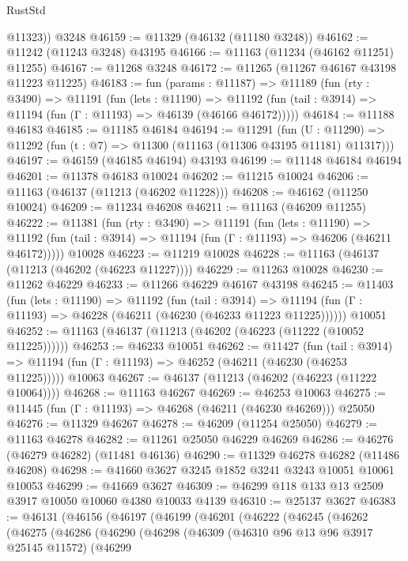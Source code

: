 \begin{lexlean}{RustStd}
\begin{coremodule}
        @11323))
    @3248
@46159 := @11329 (@46132 (@11180 @3248))
@46162 := @11242 (@11243 @3248) @43195
@46166 := @11163 (@11234 (@46162 @11251) @11255)
@46167 := @11268 @3248
@46172 := @11265 (@11267 @46167 @43198 @11223 @11225)
@46183 := fun (params : @11187) =>
  @11189
    (fun (rty : @3490) =>
    @11191
      (fun (lets : @11190) =>
      @11192 (fun (tail : @3914) => @11194 (fun (Γ : @11193) => @46139 (@46166 @46172)))))
@46184 := @11188 @46183
@46185 := @11185 @46184
@46194 := @11291
    (fun (U : @11290) => @11292 (fun (t : @7) => @11300 (@11163 (@11306 @43195 @11181) @11317)))
@46197 := @46159 (@46185 @46194) @43193
@46199 := @11148 @46184 @46194
@46201 := @11378 @46183 @10024
@46202 := @11215 @10024
@46206 := @11163 (@46137 (@11213 (@46202 @11228)))
@46208 := @46162 (@11250 @10024)
@46209 := @11234 @46208
@46211 := @11163 (@46209 @11255)
@46222 := @11381
    (fun (rty : @3490) =>
    @11191
      (fun (lets : @11190) =>
      @11192 (fun (tail : @3914) => @11194 (fun (Γ : @11193) => @46206 (@46211 @46172)))))
    @10028
@46223 := @11219 @10028
@46228 := @11163 (@46137 (@11213 (@46202 (@46223 @11227))))
@46229 := @11263 @10028
@46230 := @11262 @46229
@46233 := @11266 @46229 @46167 @43198
@46245 := @11403
    (fun (lets : @11190) =>
    @11192
      (fun (tail : @3914) =>
      @11194 (fun (Γ : @11193) => @46228 (@46211 (@46230 (@46233 @11223 @11225))))))
    @10051
@46252 := @11163 (@46137 (@11213 (@46202 (@46223 (@11222 (@10052 @11225))))))
@46253 := @46233 @10051
@46262 := @11427
    (fun (tail : @3914) => @11194 (fun (Γ : @11193) => @46252 (@46211 (@46230 (@46253 @11225)))))
    @10063
@46267 := @46137 (@11213 (@46202 (@46223 (@11222 @10064))))
@46268 := @11163 @46267
@46269 := @46253 @10063
@46275 := @11445 (fun (Γ : @11193) => @46268 (@46211 (@46230 @46269))) @25050
@46276 := @11329 @46267
@46278 := @46209 (@11254 @25050)
@46279 := @11163 @46278
@46282 := @11261 @25050 @46229 @46269
@46286 := @46276 (@46279 @46282) (@11481 @46136)
@46290 := @11329 @46278 @46282 (@11486 @46208)
@46298 := @41660 @3627 @3245 @1852 @3241 @3243 @10051 @10061 @10053
@46299 := @41669 @3627
@46309 := @46299 @118 @133 @13 @2509 @3917 @10050 @10060 @4380 @10033 @4139
@46310 := @25137 @3627
@46383 := @46131
    (@46156
      (@46197
        (@46199
          (@46201
            (@46222
              (@46245
                (@46262
                  (@46275
                    (@46286
                      (@46290
                        (@46298
                          (@46309
                            (@46310 @96 @13 @96 @3917 @25145 @11572)
                            (@46299

\end{coremodule}
\end{lexlean}

